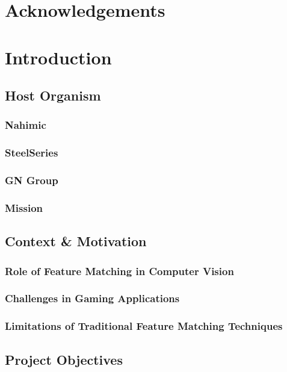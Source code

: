 \documentclass[a4paper,12pt]{report}
\begin{document}
\newpage
\tableofcontents
\listoffigures
\chapter{Acknowledgements}
\chapter{Introduction}

\section{Host Organism}
\subsection{Nahimic}
\subsection{SteelSeries}
\subsection{GN Group}
\subsection{Mission}

\section{Context \& Motivation}
\subsection{Role of Feature Matching in Computer Vision}
\subsection{Challenges in Gaming Applications}
\subsection{Limitations of Traditional Feature Matching Techniques}

\section{Project Objectives}
\end{document}
